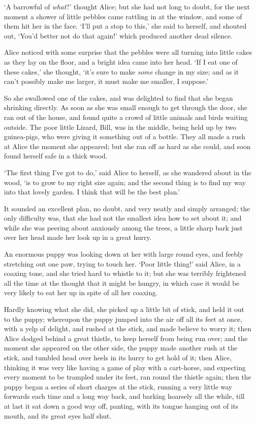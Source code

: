   `A barrowful of {\it what}?' thought Alice; but she had not long to
doubt, for the next moment a shower of little pebbles came
rattling in at the window, and some of them hit her in the face.
`I'll put a stop to this,' she said to herself, and shouted out,
`You'd better not do that again!' which produced another dead
silence.

  Alice noticed with some surprise that the pebbles were all
turning into little cakes as they lay on the floor, and a bright
idea came into her head.  `If I eat one of these cakes,' she
thought, `it's sure to make {\it some} change in my size; and as it
can't possibly make me larger, it must make me smaller, I
suppose.'

  So she swallowed one of the cakes, and was delighted to find
that she began shrinking directly.  As soon as she was small
enough to get through the door, she ran out of the house, and
found quite a crowd of little animals and birds waiting outside.
The poor little Lizard, Bill, was in the middle, being held up by
two guinea-pigs, who were giving it something out of a bottle.
They all made a rush at Alice the moment she appeared; but she
ran off as hard as she could, and soon found herself safe in a
thick wood.

  `The first thing I've got to do,' said Alice to herself, as she
wandered about in the wood, `is to grow to my right size again;
and the second thing is to find my way into that lovely garden.
I think that will be the best plan.'

  It sounded an excellent plan, no doubt, and very neatly and
simply arranged; the only difficulty was, that she had not the
smallest idea how to set about it; and while she was peering
about anxiously among the trees, a little sharp bark just over
her head made her look up in a great hurry.

  An enormous puppy was looking down at her with large round
eyes, and feebly stretching out one paw, trying to touch her.
`Poor little thing!' said Alice, in a coaxing tone, and she tried
hard to whistle to it; but she was terribly frightened all the
time at the thought that it might be hungry, in which case it
would be very likely to eat her up in spite of all her coaxing.

  Hardly knowing what she did, she picked up a little bit of
stick, and held it out to the puppy; whereupon the puppy jumped
into the air off all its feet at once, with a yelp of delight,
and rushed at the stick, and made believe to worry it; then Alice
dodged behind a great thistle, to keep herself from being run
over; and the moment she appeared on the other side, the puppy
made another rush at the stick, and tumbled head over heels in
its hurry to get hold of it; then Alice, thinking it was very
like having a game of play with a cart-horse, and expecting every
moment to be trampled under its feet, ran round the thistle
again; then the puppy began a series of short charges at the
stick, running a very little way forwards each time and a long
way back, and barking hoarsely all the while, till at last it sat
down a good way off, panting, with its tongue hanging out of its
mouth, and its great eyes half shut.

